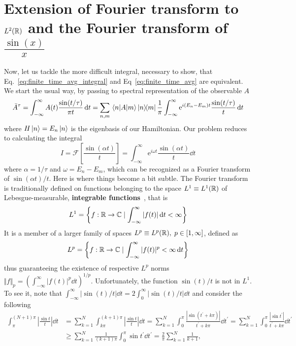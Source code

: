 \section{Extension of Fourier transform to \(L^2(\mathbb{R})\) and the Fourier transform of \(\frac{\sin(x)}{x}\)}
Now, let us tackle the more difficult integral, necessary to show, that Eq.~\eqref{eq:finite_time_avg_integral}
and Eq~\eqref{eq:finite_time_avg} are equivalent. We start the usual way, by passing to spectral representation
of the observable \(A\)
\begin{equation}
    \bar{A}^{\tau} = \int_{-\infty}^{\infty}  A(t) \frac{\sin (t/\tau )}{\pi t} \dd{t}
    = \sum_{n,m}  \matrixel{n}{A}{m} \ketbra{n}{m} \frac{1}{\pi } \int_{-\infty}^{\infty}
    \mathrm{e}^{i (E_n-E_m) t} \frac{\sin (t/\tau )}{t}\dd{t}
    \label{eq:b1}
\end{equation}
where \(H\ket{n} = E_n \ket{n}\) is the eigenbasis of our Hamiltonian. Our problem reduces to calculating
the integral
\begin{equation}
    I =\mathcal{F}\left[ \frac{\sin (\alpha t)}{t} \right]=  \int_{-\infty}^{\infty} \mathrm{e}^{i \omega  t} \frac{\sin (\alpha  t )}{t}\dd{t}
\end{equation}
where \(\alpha = 1/\tau\) and \(\omega = E_n-E_m\), which can be recognized as a Fourier transform of
\(\sin (\alpha  t )/t\). Here is where things become a bit subtle. The Fourier transform is traditionally
defined on functions belonging to the space \(L^1 \equiv L^1(\mathbb{R})\) of Lebesgue-measurable, \textbf{integrable
    functions}~\autocite{Rudin1987}, that is
\begin{equation}
    L^1 = \left\{f:\mathbb{R} \to \mathbb{C} \mid \int_{-\infty}^{\infty} |f(t)|\dd{t}  < \infty \right\}
\end{equation}
It is a member of a larger family of spaces \(L^p \equiv L^p(\mathbb{R}),\; p \in \left[ 1,\infty  \right] \), defined as
\begin{equation}
    L^p = \left\{f:\mathbb{R} \to \mathbb{C} \mid \int_{-\infty}^{\infty} |f(t)|^p < \infty \dd{t}  \right\}
\end{equation}
thus guaranteeing the existence of respective \(L^p\) norms \(\Vert f \Vert_p = \left(\int_{-\infty}^{\infty}  |f(t)|^p \dd{t}  \right)^{1/p}\).
Unfortunately, the function \(\sin (t)/t\) is not in \(L^1\). To see it, note that
\(\int_{-\infty}^{\infty} \vert \sin (t)/t \vert \dd{t} = 2 \int_{0}^{\infty} \vert \sin (t)/t \vert \dd{t}  \)
and consider the following
\begin{align*}
    \int_{\pi}^{(N+1)\pi}\left|\frac{\sin t}{t}\right|\dd{t} & =\sum_{k=1}^N\int_{k\pi}^{(k+1)\pi}\left|\frac{\sin t}t\right|\dd{t}
    =\sum_{k=1}^N\int_0^{\pi}  \frac{|\sin(t^{\prime} +k\pi)|}{t^{\prime} +k\pi}\dd{t^{\prime} }
    =\sum_{k=1}^N\int_0^{\pi}\frac{|\sin t^{\prime} |}{t^{\prime} +k\pi}    \dd{t^{\prime} }                                                     \\\
                                                             & \geq \sum_{k=1}^N\frac 1{(k+1)\pi}\int_0^{\pi}  \sin t^{\prime}  \dd{t^{\prime} }
    =\frac 2{\pi}\sum_{k=1}^N\frac 1{k+1},
\end{align*}
